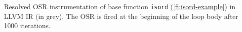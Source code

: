 \label{fig:isordfrom} Resolved OSR instrumentation of base function {\tt isord} (\myfigure\ref{fi:isord-example}) in LLVM IR (in grey). The OSR is fired at the beginning of the loop body after 1000 iterations.
